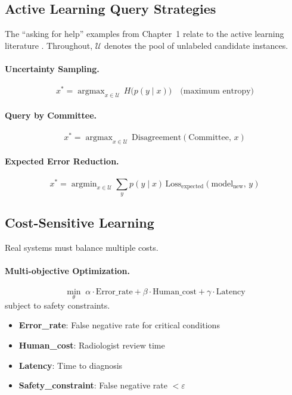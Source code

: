 \subsection{Active Learning Query Strategies}

The ``asking for help'' examples from Chapter~1 relate to the active learning literature \autocite{settles2009active}. Throughout, $\mathcal{U}$ denotes the pool of unlabeled candidate instances.

\paragraph{Uncertainty Sampling.}
\[
x^* = \operatorname{argmax}_{x \in \mathcal{U}}\, H\bigl(p(y \mid x)\bigr) \quad \text{(maximum entropy)}
\]

\paragraph{Query by Committee.}
\[
x^* = \operatorname{argmax}_{x \in \mathcal{U}}\, \text{Disagreement}(\text{Committee},\, x)
\]

\paragraph{Expected Error Reduction.}
\[
x^* = \operatorname{argmin}_{x \in \mathcal{U}} \sum_{y} p(y \mid x)\, \text{Loss}_{\text{expected}}(\text{model}_{\text{new}},\, y)
\]

\subsection{Cost-Sensitive Learning}

Real systems must balance multiple costs.

\paragraph{Multi-objective Optimization.}
\[
\min_{\theta}\; \alpha \cdot \text{Error\_rate} + \beta \cdot \text{Human\_cost} + \gamma \cdot \text{Latency}
\]
subject to safety constraints.

\begin{examplebox}
\begin{itemize}
    \item \textbf{Error\_rate}: False negative rate for critical conditions
    \item \textbf{Human\_cost}: Radiologist review time
    \item \textbf{Latency}: Time to diagnosis
    \item \textbf{Safety\_constraint}: False negative rate $< \varepsilon$
\end{itemize}
\end{examplebox}

